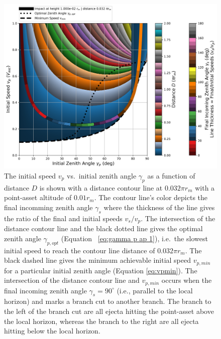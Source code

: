 \documentclass{article}
\begin{document}
\begin{figure}[!htb]
	\centering
	\includegraphics[width=1.00\linewidth]{dist_speed_zenith_plot_011_1.000e-02_0.100.png}
	\caption{The initial speed $v_p$ vs.\ initial zenith angle $\gamma_p$ as a function of distance $D$ is shown with a distance contour line at $0.032\pi r_m$ with a point-asset altitude of $0.01 r_m$. The contour line's color depicts the final incomming zenith angle $\gamma_s$ where the thickness of the line gives the ratio of the final and initial speeds $v_s/v_p$. The intersection of the distance contour line and the black dotted line gives the optimal zenith angle $\gamma_{p,opt}$ (Equation~
		\eqref{eq:gamma p ap 1}), i.e.\ the slowest initial speed to reach the contour line distance of $0.032\pi r_m$. The black dashed line gives the minimum achievable initial speed $v_{p,min}$ for a particular initial zenith angle (Equation \eqref{eq:vpmin}). The intersection of the distance contour line and $v_{p,min}$ occurs when the final incoming zenith angle $\gamma_s = 90^\circ$ (i.e., parallel to the local horizon) and marks a branch cut to another branch. The branch to the left of the branch cut are all ejecta hitting the point-asset above the local horizon, whereas the branch to the right are all ejecta hitting below the local horizon.}\label{fig:dist_speed_zenith_plot_011_1.000e-02_0.100}
\end{figure}
\end{document}
